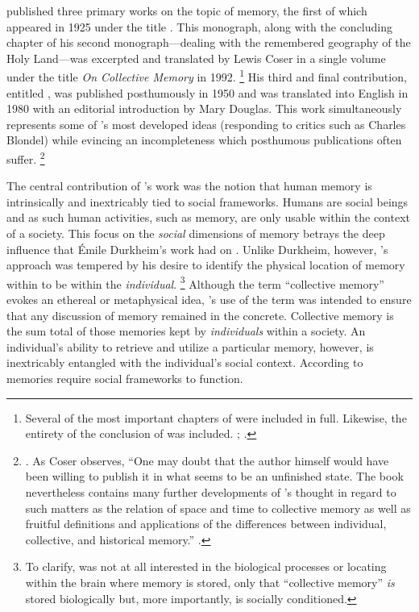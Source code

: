 \halbwachs published three primary works on the topic of memory, the first of which appeared in 1925 under the title .\autocite{halbwachs1925} This monograph, along with the concluding chapter of his second monograph---dealing with the remembered geography of the Holy Land---was excerpted and translated by Lewis Coser in a single volume under the title \emph{On Collective Memory} in 1992.%
%
\footnote{Several of the most important chapters of  were included in full. Likewise, the entirety of the conclusion of  was included. \cites{halbwachs1992}; \cite{halbwachs1941}.}
%
His third and final contribution, entitled , was published posthumously in 1950 and was translated into English in 1980 with an editorial introduction by Mary Douglas.\autocite{halbwachs1980} This work simultaneously represents some of \halbwachs's most developed ideas (responding to critics such as Charles Blondel) while evincing an incompleteness which posthumous publications often suffer.%
%
\footnote{%
\Cite{halbwachs1980}. As Coser observes, ``One may doubt that the author himself would have been willing to publish it in what seems to be an unfinished state. The book nevertheless contains many further developments of \halbwachs's thought in regard to such matters as the relation of space and time to collective memory as well as fruitful definitions and applications of the differences between individual, collective, and historical memory.'' \cite[2]{coser_halbwachs1992}.}

The central contribution of \halbwachs's work was the notion that human memory is intrinsically and inextricably tied to social frameworks.\autocite[37--38]{halbwachs1992} Humans are social beings and as such human activities, such as memory, are only usable within the context of a society. This focus on the \emph{social} dimensions of memory betrays the deep influence that Émile Durkheim's work had on \halbwachs.\autocite[8--9]{coser_halbwachs1992} Unlike Durkheim, however, \halbwachs's approach was tempered by his desire to identify the physical location of memory within to be within the \emph{individual}.%
%
\footnote{To clarify, \halbwachs was not at all interested in the biological processes or locating within the brain where memory is stored, only that ``collective memory'' \emph{is} stored biologically but, more importantly, is socially conditioned.}
%
Although the term ``collective memory'' evokes an ethereal or metaphysical idea, \halbwachs's use of the term was intended to ensure that any discussion of memory remained in the concrete. Collective memory is the sum total of those memories kept by \emph{individuals} within a society. An individual's ability to retrieve and utilize a particular memory, however, is inextricably entangled with the individual's social context. According to \halbwachs memories require social frameworks to function.\autocite[38]{halbwachs1992}  

